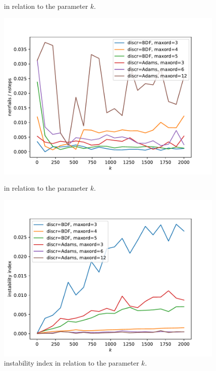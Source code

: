 \documentclass{scrartcl}
\begin{document}
\begin{figure}[h]
\begin{minipage}[b]{0.45\textwidth}
\caption{ in relation to the parameter $k$.}
\label{pl:njacs_nsteps1}
\end{minipage}
\end{figure}


\begin{figure}[h]
\centering
\begin{minipage}[b]{0.45\textwidth}
\centering
\includegraphics[width=\textwidth]{../Plots/Task4/Figure_212}
\caption{ in relation to the parameter $k$.}
\label{pl:nerrfails_nsteps1}
\end{minipage}
\hfill
\begin{minipage}[b]{0.45\textwidth}
\centering
\includegraphics[width=\textwidth]{../Plots/Task4/Figure_204}
\caption{instability index in relation to the parameter $k$.}
\label{pl:stability1}
\end{minipage}
\end{figure}
\end{document}
